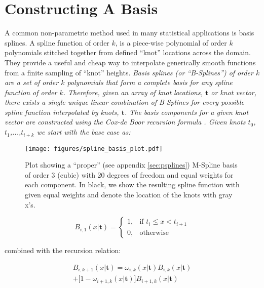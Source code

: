 \section{Constructing A Basis} \label{sec:basis_splines}

A common non-parametric method used in many statistical applications is basis splines. A spline function of order $k$, 
is a piece-wise polynomial of order $k$ polynomials stitched together from defined ``knot'' locations across the domain. 
They provide a useful and cheap way to interpolate generically smooth functions from a finite sampling of ``knot'' heights. 
\it{Basis splines} (or ``B-Splines'') of order $k$ are a set of order $k$ polynomials that form a complete basis for any spline function of order $k$. 
Therefore, given an array of knot locations, $\mathbf{t}$ or knot vector, there exists a single unique linear combination of B-Splines for 
every possible spline function interpolated by knots, $\mathbf{t}$. The basis components for a given knot vector are constructed  
using the Cox-de Boor recursion formula \citep{deBoor78}. Given knots $t_0$, $t_1$,...,$t_{i+k}$ we start with the base case as:

\begin{figure}[ht!]
    \begin{centering}
        \texttt{[image: figures/spline\_basis\_plot.pdf]}
        \caption{Plot showing a ``proper'' (see appendix \ref{sec:psplines}) M-Spline basis of order 3 (cubic) with 20 degrees of freedom and equal weights for each component. 
        In black, we show the resulting spline function with given equal weights and denote the location of the knots with gray x's.}
        \label{fig:spline_basis}
    \end{centering}
\end{figure}

\begin{equation}
    B_{i,1}(x | \mathbf{t}) = 
    \begin{cases}
        1, & \text{if } t_i \leq x < t_{i+1} \\
        0, & \text{otherwise}
    \end{cases}
\end{equation}

\noindent combined with the recursion relation:

\begin{multline*}
    B_{i,k+1}(x | \mathbf{t}) = \omega_{i,k}(x | \mathbf{t})B_{i,k}(x | \mathbf{t})\\
                                + \big[1-\omega_{i+1,k}(x | \mathbf{t})\big] B_{i+1,k}(x | \mathbf{t})
\end{multline*}

